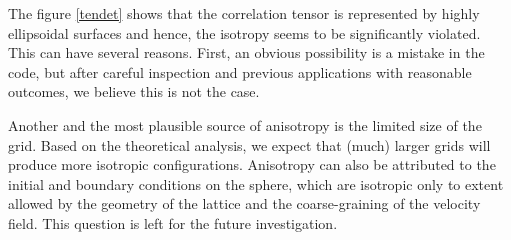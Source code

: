 
The figure \ref{tendet} shows that the correlation tensor is represented by highly ellipsoidal surfaces and hence, the isotropy seems to be significantly violated. This can have several reasons. First, an obvious possibility is a mistake in the code, but after careful inspection and previous applications with reasonable outcomes, we believe this is not the case.

Another and the most plausible source of anisotropy is the limited size of the grid. Based on the theoretical analysis, we expect that (much) larger grids will produce more isotropic configurations. Anisotropy can also be attributed to the initial and boundary conditions on the sphere, which are isotropic only to extent allowed by the geometry of the lattice and the coarse-graining of the velocity field. This question is left for the future investigation.